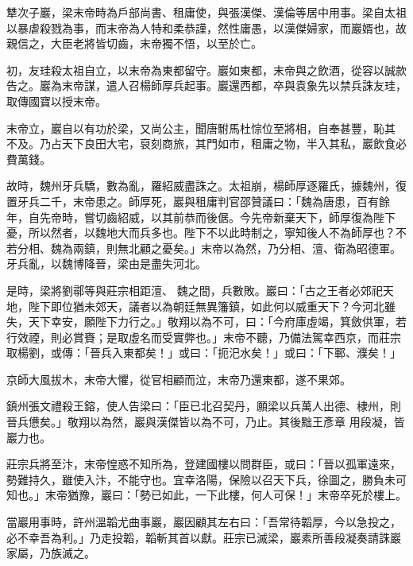 \begin{pinyinscope}
 犨次子巖，梁末帝時為戶部尚書、租庸使，與張漢傑、漢倫等居中用事。梁自太祖以暴虐殺戮為事，而末帝為人特和柔恭謹，然性庸愚，以漢傑婦家，而巖婿也，故親信之，大臣老將皆切齒，末帝獨不悟，以至於亡。



 初，友珪殺太祖自立，以末帝為東都留守。巖如東都，末帝與之飲酒，從容以誠款告之。巖為末帝謀，遣人召楊師厚兵起事。巖還西都，卒與袁象先以禁兵誅友珪，取傳國寶以授末帝。



 末帝立，巖自以有功於梁，又尚公主，聞唐駙馬杜悰位至將相，自奉甚豐，恥其
 不及。乃占天下良田大宅，裒刻商旅，其門如市，租庸之物，半入其私，巖飲食必費萬錢。



 故時，魏州牙兵驕，數為亂，羅紹威盡誅之。太祖崩，楊師厚逐羅氏，據魏州，復置牙兵二千，末帝患之。師厚死，巖與租庸判官邵贊議曰：「魏為唐患，百有餘年，自先帝時，嘗切齒紹威，以其前恭而後倨。今先帝新棄天下，師厚復為陛下憂，所以然者，以魏地大而兵多也。陛下不以此時制之，寧知後人不為師厚也？不若分相、魏為兩鎮，則無北顧之憂矣。」末帝以為然，乃分相、澶、衛為昭德軍。牙兵亂，以魏博降晉，梁由是盡失河北。



 是時，梁將劉鄩等與莊宗相距澶、
 魏之間，兵數敗。巖曰：「古之王者必郊祀天地，陛下即位猶未郊天，議者以為朝廷無異籓鎮，如此何以威重天下？今河北雖失，天下幸安，願陛下力行之。」敬翔以為不可，曰：「今府庫虛竭，箕斂供軍，若行效禋，則必賞賚；是取虛名而受實弊也。」末帝不聽，乃備法駕幸西京，而莊宗取楊劉，或傳：「晉兵入東都矣！」或曰：「扼汜水矣！」或曰：「下鄆、濮矣！」



 京師大風拔木，末帝大懼，從官相顧而泣，末帝乃還東都，遂不果郊。



 鎮州張文禮殺王鎔，使人告梁曰：「臣已北召契丹，願梁以兵萬人出德、棣州，則晉兵憊矣。」敬翔以為然，巖與漢傑皆以為不可，乃止。其後黜王彥章
 用段凝，皆巖力也。



 莊宗兵將至汴，末帝惶惑不知所為，登建國樓以問群臣，或曰：「晉以孤軍遠來，勢難持久，雖使入汴，不能守也。宜幸洛陽，保險以召天下兵，徐圖之，勝負未可知也。」末帝猶豫，巖曰：「勢已如此，一下此樓，何人可保！」末帝卒死於樓上。



 當巖用事時，許州溫韜尤曲事巖，巖因顧其左右曰：「吾常待韜厚，今以急投之，必不幸吾為利。」乃走投韜，韜斬其首以獻。莊宗已滅梁，巖素所善段凝奏請誅巖家屬，乃族滅之。




\end{pinyinscope}
